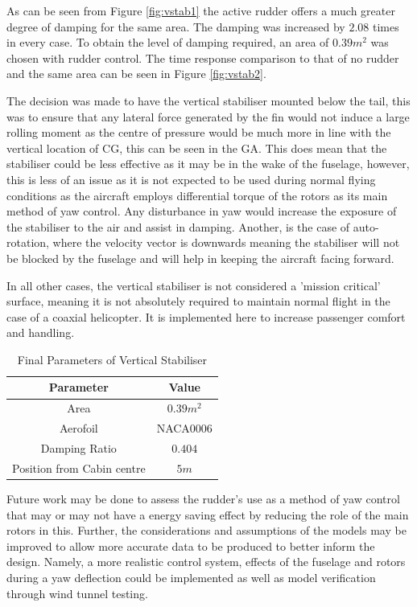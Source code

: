 \documentclass[11pt,a4paper]{article}
\begin{document}
As can be seen from Figure \ref{fig:vstab1} the active rudder offers a much greater degree of damping for the same area. The damping was increased by $2.08$ times in every case. To obtain the level of damping required, an area of $0.39m^2$ was chosen with rudder control. The time response comparison to that of no rudder and the same area can be seen in Figure \ref{fig:vstab2}.

The decision was made to have the vertical stabiliser mounted below the tail, this was to ensure that any lateral force generated by the fin would not induce a large rolling moment as the centre of pressure would be much more in line with the vertical location of CG, this can be seen in the GA. This does mean that the stabiliser could be less effective as it may be in the wake of the fuselage, however, this is less of an issue as it is not expected to be used during normal flying conditions as the aircraft employs differential torque of the rotors as its main method of yaw control. Any disturbance in yaw would increase the exposure of the stabiliser to the air and assist in damping. Another, is the case of auto-rotation, where the velocity vector is downwards meaning the stabiliser will not be blocked by the fuselage and will help in keeping the aircraft facing forward.

In all other cases, the vertical stabiliser is not considered a 'mission critical' surface, meaning it is not absolutely required to maintain normal flight in the case of a coaxial helicopter. It is implemented here to increase passenger comfort and handling.
\begin{table}[H]
\centering 
    \caption{Final Parameters of Vertical Stabiliser}
\begin{tabular}{cc}
\hline
  \rowcolor[HTML]{DAE8FC} 
  Parameter & Value  \\ \hline
   Area  & $0.39m^2$\\
   Aerofoil & NACA0006\\
   Damping Ratio & $0.404$\\
   Position from Cabin centre & $5m$\\
   \hline
\end{tabular}{}
    \label{tab:vstab}
\end{table}{}
Future work may be done to assess the rudder's use as a method of yaw control that may or may not have a energy saving effect by  reducing the role of the main rotors in this. Further, the considerations and assumptions of the models may be improved to allow more accurate data to be produced to better inform the design. Namely, a more realistic control system, effects of the fuselage and rotors during a yaw deflection could be implemented as well as model verification through wind tunnel testing.
\end{document}
